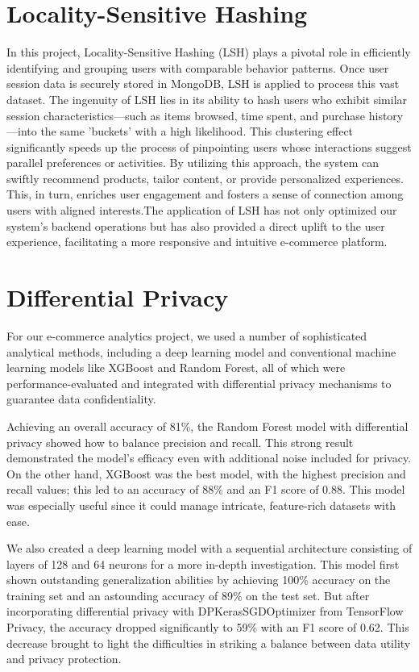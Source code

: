 \documentclass[conference]{IEEEtran}
\begin{document}
\section*{Locality-Sensitive Hashing}
In this project, Locality-Sensitive Hashing (LSH) plays a pivotal role in efficiently identifying and grouping users with comparable behavior patterns. Once user session data is securely stored in MongoDB,  LSH is applied to process this vast dataset. The ingenuity of LSH lies in its ability to hash users who exhibit similar session characteristics—such as items browsed, time spent, and purchase history—into the same 'buckets' with a high likelihood. This clustering effect significantly speeds up the process of pinpointing users whose interactions suggest parallel preferences or activities. By utilizing this approach, the system can swiftly recommend products, tailor content, or provide personalized experiences. This, in turn, enriches user engagement and fosters a sense of connection among users with aligned interests.The application of LSH has not only optimized our system’s backend operations but has also provided a direct uplift to the user experience, facilitating a more responsive and intuitive e-commerce platform.


\section*{Differential Privacy}
For our e-commerce analytics project, we used a number of sophisticated analytical methods, including a deep learning model and conventional machine learning models like XGBoost and Random Forest, all of which were performance-evaluated and integrated with differential privacy mechanisms to guarantee data confidentiality.

Achieving an overall accuracy of 81\%, the Random Forest model with differential privacy showed how to balance precision and recall. This strong result demonstrated the model's efficacy even with additional noise included for privacy. On the other hand, XGBoost was the best model, with the highest precision and recall values; this led to an accuracy of 88\% and an F1 score of 0.88. This model was especially useful since it could manage intricate, feature-rich datasets with ease.

We also created a deep learning model with a sequential architecture consisting of layers of 128 and 64 neurons for a more in-depth investigation. This model first shown outstanding generalization abilities by achieving 100\% accuracy on the training set and an astounding accuracy of 89\% on the test set. But after incorporating differential privacy with DPKerasSGDOptimizer from TensorFlow Privacy, the accuracy dropped significantly to 59\% with an F1 score of 0.62. This decrease brought to light the difficulties in striking a balance between data utility and privacy protection.
\end{document}
